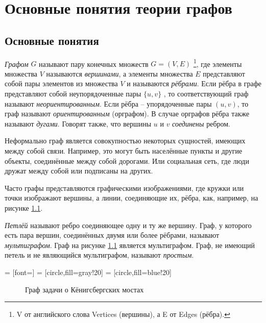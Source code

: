 
\chapter{Основные понятия теории графов}

\section{Основные понятия}

\emph{Графом} $G$ называют пару конечных множеств $G=(V, E)$
\footnote{V от английского слова Vertices (вершины), а E от Edges (рёбра).},
где элементы множества $V$ называются \emph{вершинами}, а
элементы множества $E$ представляют собой пары элементов из множества $V$ и
называются \emph{рёбрами}. Если рёбра в графе представляют собой 
неупорядоченные пары $\{u, v\}$ , то соответствующий граф называют 
\emph{неориентированным}. Если рёбра – упорядоченные пары $(u, v)$, то граф 
называют \emph{ориентированным} (орграфом). В случае орграфов рёбра также 
называют \emph{дугами}. Говорят также, что вершины $u$ и $v$ \emph{соединены} 
ребром.

Неформально граф является совокупностью некоторых сущностей, имеющих между собой
связи. Например, это могут быть населённые пункты и другие объекты, соединённые
между собой дорогами. Или социальная сеть, где люди дружат между собой или
подписаны на других.

Часто графы представляются графическими изображениями, где кружки или точки
изображают вершины, а линии, соединяющие их, рёбра, как, например, на рисунке 
\ref{the koenigsberg bridges}.

\emph{Петлёй} называют ребро соединяющее одну и ту же вершину. Граф, у которого 
есть пара вершин, соединённых двумя или более рёбрами, называют 
\emph{мультиграфом}. Граф на рисунке \ref{the koenigsberg bridges} является 
мультиграфом. Граф, не имеющий петель и не являющийся мультиграфом,
называют \emph{простым}.

 = [font=\footnotesize]
 = [circle,fill=gray!20]
 = [circle,fill=blue!20]

\begin{figure}[h]
	\center
	\caption{Граф задачи о Кёнигсбергских мостах}
	\label{the koenigsberg bridges}
\end{figure}

